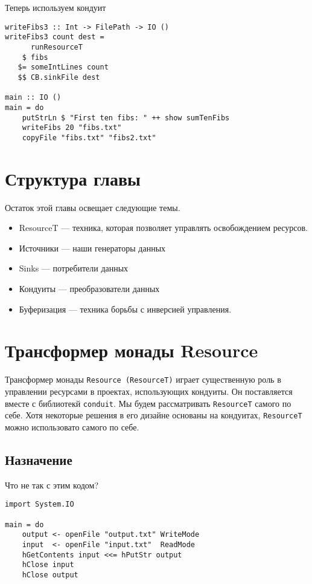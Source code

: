 Теперь используем кондуит
\begin{lstlisting}
writeFibs3 :: Int -> FilePath -> IO ()
writeFibs3 count dest =
      runResourceT
    $ fibs
   $= someIntLines count
   $$ CB.sinkFile dest

main :: IO ()
main = do
    putStrLn $ "First ten fibs: " ++ show sumTenFibs
    writeFibs 20 "fibs.txt"
    copyFile "fibs.txt" "fibs2.txt"
\end{lstlisting}

\section{Структура главы}

Остаток этой главы освещает следующие темы.
\begin{itemize}
 \item ResourceT --- техника, которая позволяет управлять освобождением ресурсов.
 \item Источники --- наши генераторы данных
 \item Sinks --- потребители данных
 \item Кондуиты --- преобразователи данных
 \item Буферизация --- техника борьбы с инверсией управления.
\end{itemize}

\section{Трансформер монады Resource}

Трансформер монады \verb*|Resource (ResourceT)| играет существенную роль в управлении
ресурсами в
проектах, использующих кондуиты. Он поставляется вместе с библиотекй \verb=conduit=. Мы
будем рассматривать \verb*|ResourceT| самого по себе. Хотя некоторые решения в его дизайне
основаны на кондуитах, \verb*|ResourceT| можно использовато самого по себе.

\subsection{Назначение}

Что не так с этим кодом?
\begin{lstlisting}
import System.IO

main = do
    output <- openFile "output.txt" WriteMode
    input  <- openFile "input.txt"  ReadMode
    hGetContents input <<= hPutStr output
    hClose input
    hClose output
\end{lstlisting}

